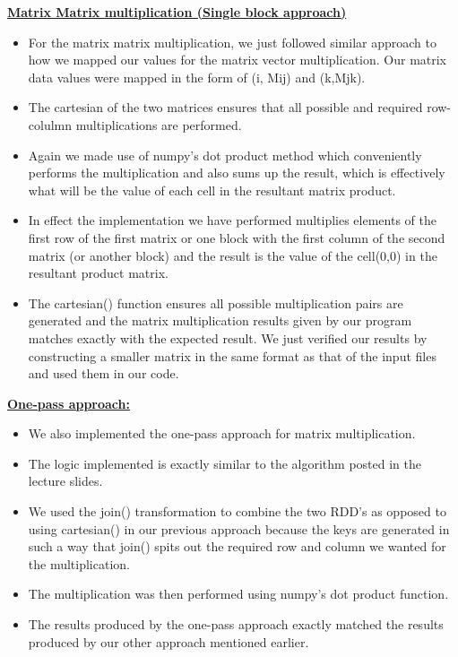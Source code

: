 \documentclass[11pt]{article}
\begin{document}
\begin{itemize}
\textbf{\underline{Matrix Matrix multiplication (Single block approach)}}

\begin{itemize}
	\item For the matrix matrix multiplication, we just followed similar approach to how we mapped our values for the matrix vector multiplication. Our matrix data values were mapped in the form of (i, Mij) and (k,Mjk).
	
	\item The cartesian of the two matrices ensures that all possible and required row-colulmn multiplications are performed.
	
	\item Again we made use of numpy's dot product method which conveniently performs the multiplication and also sums up the result, which is effectively what will be the value of each cell in the resultant matrix product.
	
	\item In effect the implementation we have performed multiplies elements of the first row of the first matrix or one block with the first column of the second matrix (or another block) and the result is the value of the cell(0,0) in the resultant product matrix.
	
	\item The cartesian() function ensures all possible multiplication pairs are generated and the matrix multiplication results given by our program matches exactly with the expected result. We just verified our results by constructing a smaller matrix in the same format as that of the input files and used them in our code.
%	
%	
\end{itemize}

\textbf{\underline{One-pass approach:}}

\begin{itemize}
	\item We also implemented the one-pass approach for matrix multiplication.
	\item The logic implemented is exactly similar to the algorithm posted in the lecture slides.
	\item We used the join() transformation to combine the two RDD's as opposed to using cartesian() in our previous approach because the keys are generated in such a way that join() spits out the required row and column we wanted for the multiplication.
	\item  The multiplication was then performed using numpy's dot product function.
	\item The results produced by the one-pass approach exactly matched the results produced by our other approach mentioned earlier.
\end{itemize}


\end{itemize}
\end{document}
